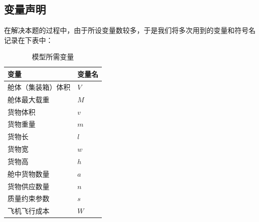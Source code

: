 \documentclass{article}
\begin{document}
	\subsection{变量声明}
	在解决本题的过程中，由于所设变量数较多，于是我们将多次用到的变量和符号名记录在下表中：
	\begin{table}[!h]
		\centering
		\caption{模型所需变量}
		\begin{tabular}{|l|l|}
			\hline
			变量 & 变量名 \\
			\hline
			舱体（集装箱）体积 & $V$\\
			舱体最大载重& $M$\\
			货物体积 &$v$\\
			货物重量 &$m$\\
			货物长 &$l$\\
			货物宽 &$w$\\
			货物高 &$h$\\
			舱中货物数量 &$a$\\
			货物供应数量 &$n$\\
			质量约束参数 &$s$\\
			飞机飞行成本 &$W$\\
			\hline
		\end{tabular}
	\end{table}

	\newpage
\end{document}

